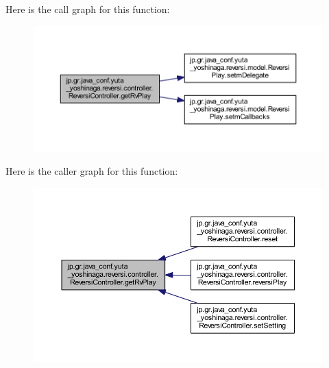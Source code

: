 Here is the call graph for this function\+:
\nopagebreak
\begin{figure}[H]
\begin{center}
\leavevmode
\includegraphics[width=350pt]{classjp_1_1gr_1_1java__conf_1_1yuta__yoshinaga_1_1reversi_1_1controller_1_1_reversi_controller_ae0b09a6cc58c14296aaed1cf50ab1087_cgraph}
\end{center}
\end{figure}
Here is the caller graph for this function\+:
\nopagebreak
\begin{figure}[H]
\begin{center}
\leavevmode
\includegraphics[width=350pt]{classjp_1_1gr_1_1java__conf_1_1yuta__yoshinaga_1_1reversi_1_1controller_1_1_reversi_controller_ae0b09a6cc58c14296aaed1cf50ab1087_icgraph}
\end{center}
\end{figure}
\mbox{\label{classjp_1_1gr_1_1java__conf_1_1yuta__yoshinaga_1_1reversi_1_1controller_1_1_reversi_controller_a7f9b86ce3c02d16c8bb08adbcfda6957}} 
